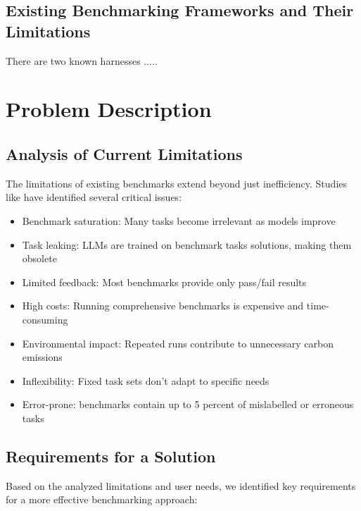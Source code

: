 \section{Existing Benchmarking Frameworks and Their Limitations}
There are two known harnesses .....

\chapter{Problem Description}

\section{Analysis of Current Limitations}

The limitations of existing benchmarks extend beyond just inefficiency. Studies like  have identified several critical issues:

\begin{itemize}
    \item Benchmark saturation: Many tasks become irrelevant as models improve \cite{vendrow2025largelanguagemodelbenchmarks}
    \item Task leaking: LLMs are trained on benchmark tasks solutions, making them obsolete \cite{vendrow2025largelanguagemodelbenchmarks}
    \item Limited feedback: Most benchmarks provide only pass/fail results
    \item High costs: Running comprehensive benchmarks is expensive and time-consuming
    \item Environmental impact: Repeated runs contribute to unnecessary carbon emissions
    \item Inflexibility: Fixed task sets don't adapt to specific needs
    \item Error-prone: benchmarks contain up to 5 percent of mislabelled or erroneous tasks \cite{vendrow2025largelanguagemodelbenchmarks}
\end{itemize}


\section{Requirements for a Solution}

Based on the analyzed limitations and user needs, we identified key requirements for a more effective benchmarking approach:

